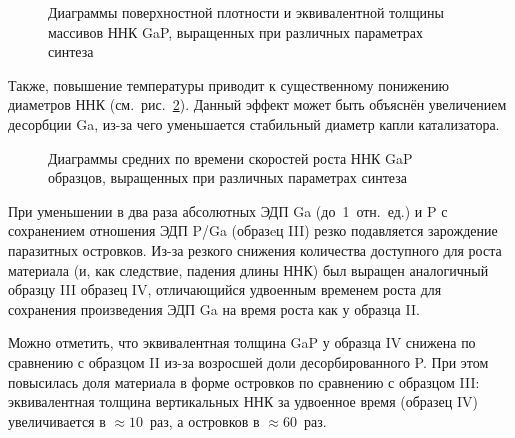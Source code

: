 \begin{figure}[ht]   \caption{Диаграммы поверхностной плотности и эквивалентной
		толщины массивов ННК GaP, выращенных при различных параметрах
синтеза}\label{fig:Image_42_1} \end{figure}

Также, повышение температуры приводит к существенному понижению диаметров ННК
(см.~рис.~\cref{fig:Image_42_2}). Данный эффект может быть объяснён увеличением
десорбции Ga, из-за чего уменьшается стабильный диаметр капли катализатора.

\begin{figure}[ht]  
	\caption{Диаграммы средних по времени скоростей роста ННК GaP образцов,
выращенных при различных параметрах синтеза}\label{fig:Image_42_2} \end{figure}

При уменьшении в два раза абсолютных ЭДП Ga (до~1~отн.~ед.) и P с сохранением
отношения ЭДП P/Ga (образeц III) резко подавляется зарождение паразитных
островков. Из-за резкого снижения количества доступного для роста материала (и,
как следствие, падения длины ННК) был выращен аналогичный образцу III образец
IV, отличающийся удвоенным временем роста для сохранения произведения ЭДП Ga на
время роста как у образца II.

Можно отметить, что эквивалентная толщина GaP у образца IV снижена по сравнению
с образцом II из-за возросшей доли десорбированного P. При этом повысилась доля
материала в форме островков по сравнению с образцом III: эквивалентная толщина
вертикальных ННК за удвоенное время (образец IV) увеличивается в \(\approx
10\)~раз, а островков в \(\approx 60\)~раз.

